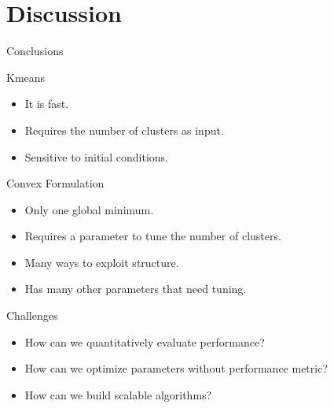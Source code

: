 \documentclass[12pt]{beamer}
\begin{document}
\section{Discussion}


\begin{frame}{Conclusions}
	
\begin{block}{Kmeans}
	\begin{itemize}
	\item It is fast.\\
	\item Requires the number of clusters as input.
	\item Sensitive to initial conditions.
	\end{itemize}
\end{block}

\begin{block}{Convex Formulation}
\begin{itemize}
\item Only one global minimum.\\
\item Requires a parameter to tune the number of clusters. \\
\item Many ways to exploit structure.
\item Has many other parameters that need tuning.
\end{itemize}
\end{block}




\end{frame}

\begin{frame}{Challenges}
	\begin{itemize}
		\item How can we quantitatively evaluate performance?
		\item How can we optimize parameters without performance metric?
		\item How can we build scalable algorithms?
	\end{itemize}

\end{frame}
\end{document}

